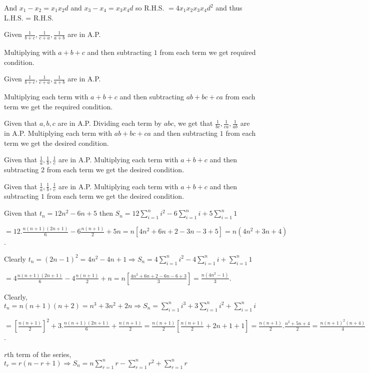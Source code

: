   And $x_1 - x_2 = x_1x_2d$ and $x_3 - x_4 = x_3x_4d$ so R.H.S. $= 4x_1x_2x_3x_4d^2$ and thus L.H.S. =
  R.H.S.
\item Given $\frac{1}{b + c}, \frac{1}{c + a}, \frac{1}{a + b}$ are in A.P.

  Multiplying with $a + b + c$ and then subtracting $1$ from each term we get required condition.
\item Given $\frac{1}{b + c}, \frac{1}{c + a}, \frac{1}{a + b}$ are in A.P.

  Multiplying each term with $a + b+ c$ and then subtracting $ab + bc + ca$ from each term we get the
  required condition.
\item Given that $a, b, c$ are in A.P. Dividing each term by $abc$, we get that $\frac{1}{bc}, \frac{1}{ca},
  \frac{1}{ab}$ are in A.P. Multiplying each term with $ab + bc + ca$ and then subtracting $1$ from each
  term we get the desired condition.
\item Given that $\frac{1}{a}, \frac{1}{b}, \frac{1}{c}$ are in A.P. Multiplying each term with $a + b + c$
  and then subtracting $2$ from each term we get the desired condition.
\item Given that $\frac{1}{a}, \frac{1}{b}, \frac{1}{c}$ are in A.P. Multiplying each term with $a + b + c$
  and then subtracting $1$ from each term we get the desired condition.
\item Given that $t_n = 12n^2 - 6n + 5$ then $\displaystyle S_n = 12\sum_{i = 1}^ni^2 - 6\sum_{i=1}^ni + 5\sum_{i=1}^n1$

  $= 12.\frac{n(n + 1)(2n + 1)}{6} - 6\frac{n(n + 1)}{2} + 5n = n\left[4n^2 + 6n + 2 - 3n - 3 + 5\right]
  = n(4n^2 + 3n  + 4)$.
\item Clearly $t_n = (2n - 1)^2 = 4n^2 - 4n + 1 \Rightarrow \displaystyle S_n = 4\sum_{i =1}^ni^2 -
  4\sum_{i=1}^ni + \sum_{i=1}^n1$

  $= 4\frac{n(n + 1)(2n + 1)}{6}- 4\frac{n(n + 1)}{2} + n = n\left[\frac{4n^2 + 6n + 2 - 6n - 6 +
      3}{3}\right] = \frac{n(4n^2 -1)}{3}$.
\item Clearly, $t_n = n(n + 1)(n + 2) = n^3 + 3n^2 + 2n \Rightarrow \displaystyle S_n = \sum_{i= 1}^ni^3 +
  3\sum_{i=1}^n i^2 + \sum_{i=1}^ni$

  $= \left[\frac{n(n + 1)}{2}\right]^2 + 3.\frac{n(n + 1)(2n + 1)}{6} + \frac{n(n + 1)}{2} = \frac{n(n +
    1)}{2}\left[\frac{n(n + 1)}{2} + 2n + 1 + 1\right] = \frac{n(n + 1)}{2}.\frac{n^2 + 5n + 4}{2} =
  \frac{n(n + 1)^2(n + 4)}{4}$.
\item $r$th term of the series, $t_r = r(n - r + 1)\Rightarrow\displaystyle S_n = n\sum_{r=1}^nr -
  \sum_{r=1}^nr^2 + \sum_{r=1}^nr$

